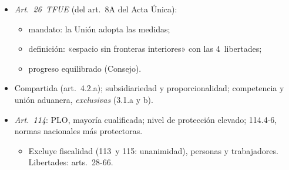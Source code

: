 \documentclass{article}
\begin{document}
\begin{columnas}
\begin{itemize}
\item \emph{Art.~26~TFUE} (del art.~8A del Acta Única):
  \begin{itemize}
  \item mandato: la Unión adopta las medidas;
  \item definición: «espacio sin fronteras interiores» con las 4~libertades;
  \item progreso equilibrado (Consejo).
  \end{itemize}
\item Compartida (art.~4.2.a); subsidiariedad y proporcionalidad; competencia y unión aduanera, \emph{exclusivas} (3.1.a y b).
\item \emph{Art.~114}: PLO, mayoría cualificada; nivel de protección elevado; 114.4-6, normas nacionales más protectoras.
  \begin{itemize}
  \item Excluye fiscalidad (113~y 115: unanimidad), personas y trabajadores. Libertades: arts.~28-66.
  \end{itemize}
\end{itemize}


\end{columnas}
\end{document}
